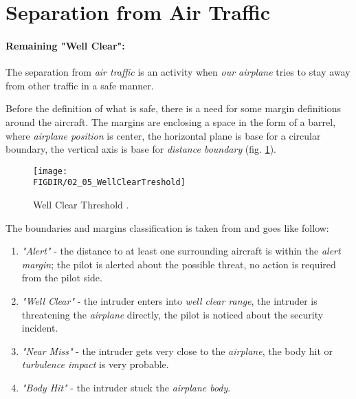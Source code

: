 \newpage
\section{Separation from Air Traffic}\label{sec:WellClear}

\paragraph{Remaining "Well Clear":} The separation from \emph{air traffic} is an activity when \emph{our airplane} tries to stay away from other traffic in a safe manner.  

Before the definition of what is safe, there is a need for some margin definitions around the aircraft. The margins are enclosing a space in the form of a barrel, where \emph{airplane position} is center, the horizontal plane is base for a circular boundary, the vertical axis is base for \emph{distance boundary} (fig. \ref{fig:WellClearTreshold}).

\begin{figure}[H]
    \centering
    \texttt{[image: \\FIGDIR/02\_05\_WellClearTreshold]}
    \caption{Well Clear Threshold \cite{valavanis2015uav,united1983pilots}.}
    \label{fig:WellClearTreshold}
\end{figure}

\noindent The boundaries and margins classification is taken from \cite{united1983pilots,valavanis2015uav} and goes like follow:

\begin{enumerate}
    \item \emph{"Alert"} - the distance to at least one surrounding aircraft is within the \emph{alert margin}; the pilot is alerted about the possible threat, no action is required from the pilot side.
    
    \item \emph{"Well Clear"} - the intruder enters into \emph{well clear range}, the intruder is threatening the \emph{airplane} directly, the pilot is noticed about the security incident.
    
    \item \emph{"Near Miss"} - the intruder gets very close to the \emph{airplane}, the body hit or \emph{turbulence impact} is very probable. 
    
    \item \emph{"Body Hit"} - the intruder stuck the \emph{airplane body}.
\end{enumerate}

